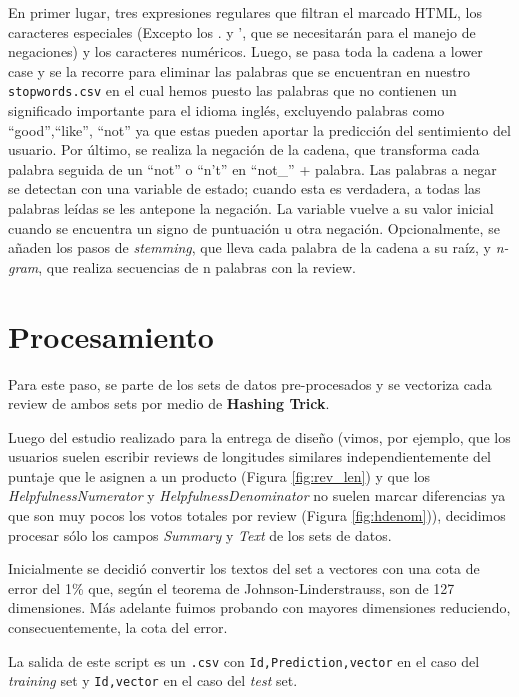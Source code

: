\documentclass[10pt,a4paper]{article}
\begin{document}
En primer lugar, tres expresiones regulares que filtran el marcado HTML, los caracteres especiales (Excepto los . y ', que se necesitarán para el manejo de negaciones) y los caracteres numéricos.
Luego, se pasa toda la cadena a lower case y se la recorre para eliminar las palabras que se encuentran en nuestro \texttt{stopwords.csv} en el cual hemos puesto las palabras que no contienen un significado importante para el idioma inglés, excluyendo palabras como ``good'',``like'', ``not'' ya que estas pueden aportar la predicción del sentimiento del usuario.  
Por último, se realiza la negación de la cadena, que transforma cada palabra seguida de un ``not'' o ``n't'' en ``not\_'' + palabra. Las palabras a negar se detectan con una variable de estado; cuando esta es verdadera, a todas las palabras leídas se les antepone la negación. La variable vuelve a su valor inicial cuando se encuentra un signo de puntuación u otra negación.
Opcionalmente, se añaden los pasos de \textit{stemming}, que lleva cada palabra de la cadena a su raíz, y \textit{n-gram}, que realiza secuencias de n palabras con la review. 

\section{Procesamiento}
Para este paso, se parte de los sets de datos pre-procesados y se vectoriza cada review de ambos sets por medio de \textbf{Hashing Trick}.

Luego del estudio realizado para la entrega de diseño (vimos, por ejemplo, que los usuarios suelen escribir reviews de longitudes similares independientemente del puntaje que le asignen a un producto (Figura \ref{fig:rev_len}) y que los \textit{HelpfulnessNumerator} y \textit{HelpfulnessDenominator} no suelen marcar diferencias ya que son muy pocos los votos totales por review (Figura \ref{fig:hdenom})), decidimos procesar sólo los campos \textit{Summary} y \textit{Text} de los sets de datos.

Inicialmente se decidió convertir los textos del set a vectores con una cota de error del 1\% que, según el teorema de Johnson-Linderstrauss, son de 127 dimensiones. Más adelante fuimos probando con mayores dimensiones reduciendo, consecuentemente, la cota del error.

La salida de este script es un \texttt{.csv} con \texttt{Id,Prediction,vector} en el caso del \textit{training} set y \texttt{Id,vector} en el caso del \textit{test} set.
\end{document}
